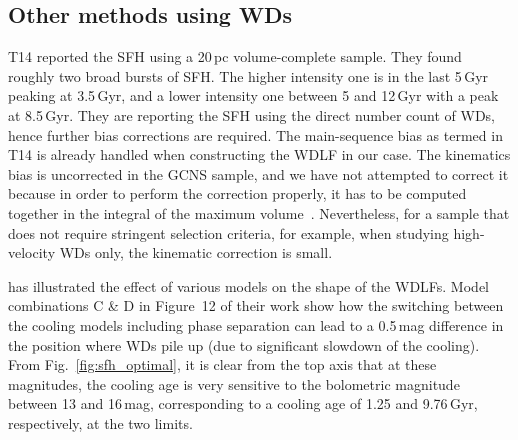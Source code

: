 \documentclass[fleqn,usenatbib]{mnras}
\begin{document}


\subsection{Other methods using WDs \label{ssec:otherMethodsWds}}
T14 reported the SFH using a 20\,pc volume-complete sample. They found roughly
two broad bursts of SFH. The higher intensity one is in the last 5\,Gyr peaking
at 3.5\,Gyr, and a lower intensity one between 5 and 12\,Gyr with a peak at
8.5\,Gyr. They are reporting the SFH using the direct number count of WDs,
hence further bias corrections are required. The main-sequence bias as termed in
T14 is already handled when constructing the WDLF in our case. The kinematics
bias is uncorrected in the GCNS sample, and we have not attempted to correct it
because in order to perform the correction properly, it has to be computed 
together in the integral of the maximum volume~\citep{2015MNRAS.450.4098L}.
Nevertheless, for a sample that does not require stringent selection
criteria, for example, when studying high-velocity WDs only, the
kinematic correction is small.

\citet{2022RASTI...1...81L} has illustrated the effect of various models on 
the shape of the WDLFs. Model combinations C \& D in Figure~12 of their work show how the 
switching between the cooling models including phase separation can lead to
a 0.5\,mag difference in the position where WDs pile up (due to significant
slowdown of the cooling). From Fig.~\ref{fig:sfh_optimal}, it is clear from the
top axis that at these magnitudes, the cooling age is very sensitive to the
bolometric magnitude between 13 and 16\,mag, corresponding to a cooling age of
1.25 and 9.76\,Gyr, respectively, at the two limits.
\end{document}

